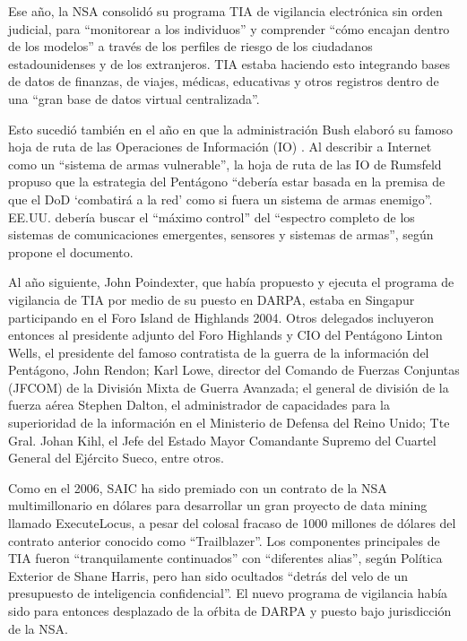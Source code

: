 \documentclass[10pt,a5paper,twoside,spanish,]{book}
\begin{document}
Ese año, la NSA consolidó su programa TIA de vigilancia electrónica sin
orden judicial, para ``monitorear a los individuos'' y comprender ``cómo
encajan dentro de los modelos'' a través de los perfiles de riesgo de
los ciudadanos estadounidenses y de los extranjeros. TIA estaba haciendo
esto integrando bases de datos de finanzas, de viajes, médicas,
educativas y otros registros dentro de una ``gran base de datos virtual
centralizada''.

Esto sucedió también en el año en que la administración Bush elaboró su
famoso hoja de ruta de las Operaciones de Información (IO) . Al
describir a Internet como un ``sistema de armas vulnerable'', la hoja de
ruta de las IO de Rumsfeld propuso que la estrategia del Pentágono
``debería estar basada en la premisa de que el DoD `combatirá a la red'
como si fuera un sistema de armas enemigo''. EE.UU. debería buscar el
``máximo control'' del ``espectro completo de los sistemas de
comunicaciones emergentes, sensores y sistemas de armas'', según propone
el documento.

Al año siguiente, John Poindexter, que había propuesto y ejecuta el
programa de vigilancia de TIA por medio de su puesto en DARPA, estaba en
Singapur participando en el Foro Island de Highlands 2004. Otros
delegados incluyeron entonces al presidente adjunto del Foro Highlands y
CIO del Pentágono Linton Wells, el presidente del famoso contratista de
la guerra de la información del Pentágono, John Rendon; Karl Lowe,
director del Comando de Fuerzas Conjuntas (JFCOM) de la División Mixta
de Guerra Avanzada; el general de división de la fuerza aérea Stephen
Dalton, el administrador de capacidades para la superioridad de la
información en el Ministerio de Defensa del Reino Unido; Tte Gral. Johan
Kihl, el Jefe del Estado Mayor Comandante Supremo del Cuartel General
del Ejército Sueco, entre otros.

Como en el 2006, SAIC ha sido premiado con un contrato de la NSA
multimillonario en dólares para desarrollar un gran proyecto de data
mining llamado ExecuteLocus, a pesar del colosal fracaso de 1000
millones de dólares del contrato anterior conocido como ``Trailblazer''.
Los componentes principales de TIA fueron ``tranquilamente continuados''
con ``diferentes alias'', según Política Exterior de Shane Harris, pero
han sido ocultados ``detrás del velo de un presupuesto de inteligencia
confidencial''. El nuevo programa de vigilancia había sido para entonces
desplazado de la oŕbita de DARPA y puesto bajo jurisdicción de la NSA.
\end{document}

